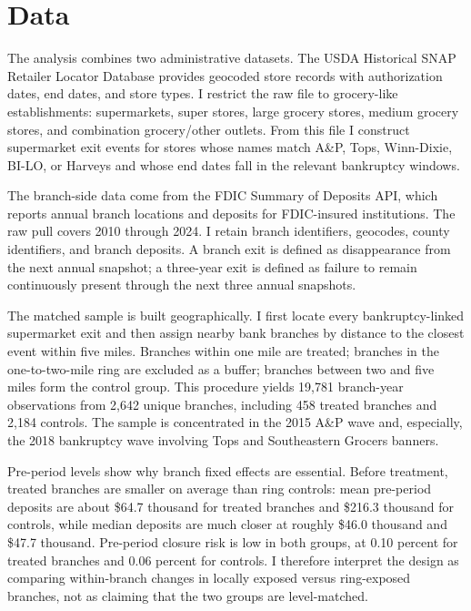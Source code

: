 \documentclass[12pt]{article}
\begin{document}
\section{Data}

The analysis combines two administrative datasets. The USDA Historical SNAP Retailer Locator Database provides geocoded store records with authorization dates, end dates, and store types. I restrict the raw file to grocery-like establishments: supermarkets, super stores, large grocery stores, medium grocery stores, and combination grocery/other outlets. From this file I construct supermarket exit events for stores whose names match A\&P, Tops, Winn-Dixie, BI-LO, or Harveys and whose end dates fall in the relevant bankruptcy windows.

The branch-side data come from the FDIC Summary of Deposits API, which reports annual branch locations and deposits for FDIC-insured institutions. The raw pull covers 2010 through 2024. I retain branch identifiers, geocodes, county identifiers, and branch deposits. A branch exit is defined as disappearance from the next annual snapshot; a three-year exit is defined as failure to remain continuously present through the next three annual snapshots.

The matched sample is built geographically. I first locate every bankruptcy-linked supermarket exit and then assign nearby bank branches by distance to the closest event within five miles. Branches within one mile are treated; branches in the one-to-two-mile ring are excluded as a buffer; branches between two and five miles form the control group. This procedure yields 19,781 branch-year observations from 2,642 unique branches, including 458 treated branches and 2,184 controls. The sample is concentrated in the 2015 A\&P wave and, especially, the 2018 bankruptcy wave involving Tops and Southeastern Grocers banners.

Pre-period levels show why branch fixed effects are essential. Before treatment, treated branches are smaller on average than ring controls: mean pre-period deposits are about \$64.7 thousand for treated branches and \$216.3 thousand for controls, while median deposits are much closer at roughly \$46.0 thousand and \$47.7 thousand. Pre-period closure risk is low in both groups, at 0.10 percent for treated branches and 0.06 percent for controls. I therefore interpret the design as comparing within-branch changes in locally exposed versus ring-exposed branches, not as claiming that the two groups are level-matched.
\end{document}
